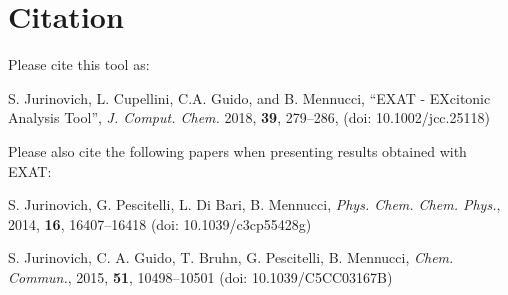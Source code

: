 \documentclass[a4paper,11pt]{article}
\begin{document}
\section{Citation}

Please cite this tool as: 

S. Jurinovich, L. Cupellini, C.A. Guido, and B. Mennucci,  ``EXAT - EXcitonic Analysis Tool'', \emph{J. Comput. Chem.} 2018, \textbf{39}, 279--286,   (doi: 10.1002/jcc.25118)


Please also cite the following papers when presenting results obtained with EXAT:


S. Jurinovich, G. Pescitelli, L. Di Bari, B. Mennucci, \emph{Phys. Chem. Chem. Phys.}, 2014, \textbf{16}, 16407--16418 (doi: 10.1039/c3cp55428g)

S. Jurinovich, C. A. Guido, T. Bruhn, G. Pescitelli, B. Mennucci,  \emph{Chem. Commun.}, 2015, \textbf{51}, 10498--10501 (doi: 10.1039/C5CC03167B)
\end{document}
